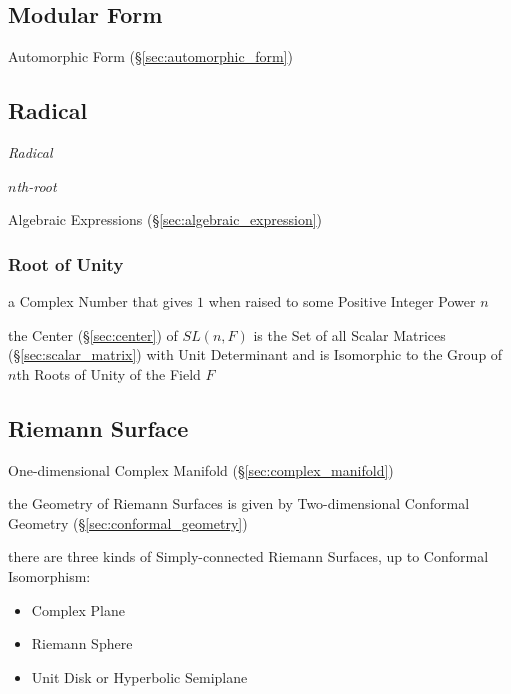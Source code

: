 \subsection{Modular Form}\label{sec:modular_form}

Automorphic Form (\S\ref{sec:automorphic_form})



\subsection{Radical}\label{sec:radical}

\emph{Radical}

\emph{$n$th-root}

Algebraic Expressions (\S\ref{sec:algebraic_expression})



\subsubsection{Root of Unity}\label{sec:unity_root}

a Complex Number that gives $1$ when raised to some Positive Integer Power $n$

the Center (\S\ref{sec:center}) of $SL(n,F)$ is the Set of all Scalar Matrices
(\S\ref{sec:scalar_matrix}) with Unit Determinant and is Isomorphic to the
Group of $n$th Roots of Unity of the Field $F$



\subsection{Riemann Surface}\label{sec:riemann_surface}

One-dimensional Complex Manifold (\S\ref{sec:complex_manifold})

the Geometry of Riemann Surfaces is given by Two-dimensional Conformal
Geometry (\S\ref{sec:conformal_geometry})

there are three kinds of Simply-connected Riemann Surfaces, up to Conformal
Isomorphism:
\begin{itemize}
  \item Complex Plane
  \item Riemann Sphere
  \item Unit Disk or Hyperbolic Semiplane
\end{itemize}



